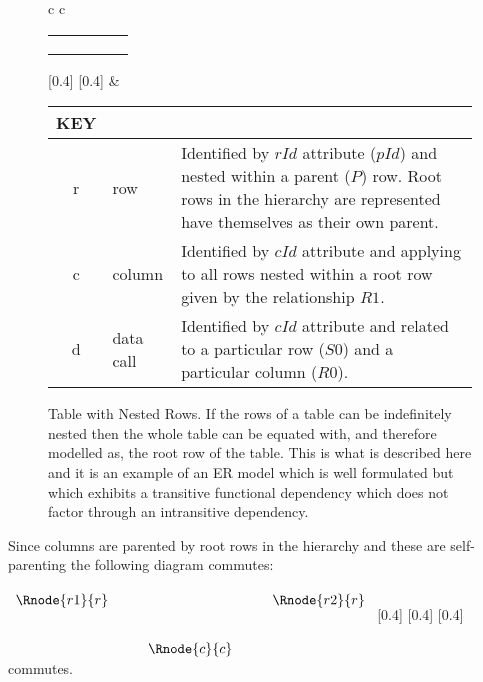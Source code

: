 \begin{figure} [h]
\begin{center}
\begin{tabular}{c c}
\begin{tabular}{c p{0.5cm} c p{0.7cm} c}
   \Rnode{r}{r}   & &                  & &              \\[0.8cm]
                      & & \Rnode{c}{c} & & \Rnode{v}{v} \\[0.8cm]
   \Rnode{d}{d} & &                  & & 
\end{tabular}
[0.4]
[0.4]
\idcomp
{} 
\idcomp
{} 
\idcomp
{} 
& \footnotesize
\begin{tabular}{c p{1.5cm} p{4cm}}
KEY && \\
\hline
r & row & Identified by $rId$ attribute ($pId$) and
           nested within a parent ($P$) row. Root rows in the hierarchy
				  are represented have themselves as their own parent.\\
c & column & Identified by $cId$ attribute and applying to all rows
              nested within a root row given by the relationship $R1$. \\
d & data call & Identified by $cId$ attribute and related to a particular
                row ($S0$) and a particular column ($R0$). \\
\end{tabular} 
\end{tabular}
\end{center}
\caption{Table with Nested Rows. If the rows of a table can be indefinitely nested then the whole table can be equated with,
and therefore modelled as, the root row of the table. This is what is described here and it is an example of an ER model 
which is well formulated but which exhibits a transitive functional dependency which does not factor through an intransitive dependency.
}
\label{nestedrowsexample}
\end{figure}

Since columns are parented by root rows in the hierarchy and these are self-parenting the following diagram commutes:
$
\begin{array}{c p{0.3cm} c p{0.3cm} c}
                  & &              & &                 \\ %
   \Rnode{r1}{r}  & &              & &  \Rnode{r2}{r}  \\[0.8cm]
                  & & \Rnode{c}{c} & &                 
\end{array}
$
[0.4]
[0.4]
[0.4]
commutes. 


